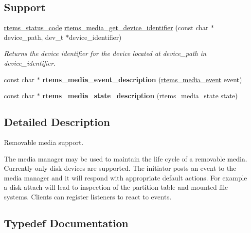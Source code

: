 \subsection*{Support}
\begin{DoxyCompactItemize}
\item 
\mbox{\hyperlink{group__ClassicStatus_ga545d41846817eaba6143d52ee4d9e9fe}{rtems\+\_\+status\+\_\+code}} \mbox{\hyperlink{group__RTEMSIOMedia_ga5eaaa6cfb5a7e811e5deadb77ca2aaa2}{rtems\+\_\+media\+\_\+get\+\_\+device\+\_\+identifier}} (const char $\ast$device\+\_\+path, dev\+\_\+t $\ast$device\+\_\+identifier)
\begin{DoxyCompactList}\small\item\em Returns the device identifier for the device located at {\itshape device\+\_\+path} in {\itshape device\+\_\+identifier}. \end{DoxyCompactList}\item 
\mbox{\label{group__RTEMSIOMedia_ga262bae9484c4c06fa89a090d44f922c4}} 
const char $\ast$ {\bfseries rtems\+\_\+media\+\_\+event\+\_\+description} (\mbox{\hyperlink{group__RTEMSIOMedia_gadd58c5799ee997413d4d6be2ac05197b}{rtems\+\_\+media\+\_\+event}} event)
\item 
\mbox{\label{group__RTEMSIOMedia_gaadf7f66cb817fb0f71a4d879e7aed1ae}} 
const char $\ast$ {\bfseries rtems\+\_\+media\+\_\+state\+\_\+description} (\mbox{\hyperlink{group__RTEMSIOMedia_gaaec542a8c74e36e4edf774f2313fcd7c}{rtems\+\_\+media\+\_\+state}} state)
\end{DoxyCompactItemize}


\subsection{Detailed Description}
Removable media support. 

The media manager may be used to maintain the life cycle of a removable media. Currently only disk devices are supported. The initiator posts an event to the media manager and it will respond with appropriate default actions. For example a disk attach will lead to inspection of the partition table and mounted file systems. Clients can register listeners to react to events. 

\subsection{Typedef Documentation}
\mbox{\label{group__RTEMSIOMedia_ga8f3e1a300d58555b3c2921df90d2d637}} 
